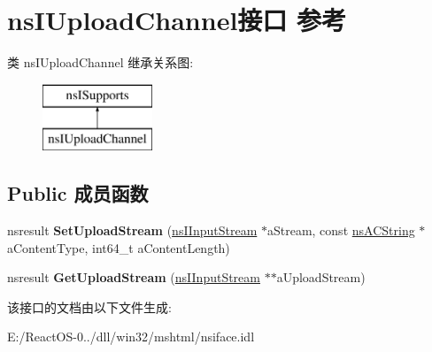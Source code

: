 \hypertarget{interfacens_i_upload_channel}{}\section{ns\+I\+Upload\+Channel接口 参考}
\label{interfacens_i_upload_channel}
类 ns\+I\+Upload\+Channel 继承关系图\+:\begin{figure}[H]
\begin{center}
\leavevmode
\includegraphics[height=2.000000cm]{interfacens_i_upload_channel}
\end{center}
\end{figure}
\subsection*{Public 成员函数}
\begin{DoxyCompactItemize}
\item 
\mbox{\label{interfacens_i_upload_channel_ab0c4fd2fafcd3bdb638252cf11cf1016}} 
nsresult {\bfseries Set\+Upload\+Stream} (\hyperlink{interfacens_i_input_stream}{ns\+I\+Input\+Stream} $\ast$a\+Stream, const \hyperlink{structns_c_string_container}{ns\+A\+C\+String} $\ast$a\+Content\+Type, int64\+\_\+t a\+Content\+Length)
\item 
\mbox{\label{interfacens_i_upload_channel_a3dc9cd19c2159530a815ce078e5df312}} 
nsresult {\bfseries Get\+Upload\+Stream} (\hyperlink{interfacens_i_input_stream}{ns\+I\+Input\+Stream} $\ast$$\ast$a\+Upload\+Stream)
\end{DoxyCompactItemize}


该接口的文档由以下文件生成\+:\begin{DoxyCompactItemize}
\item 
E\+:/\+React\+O\+S-\/0../dll/win32/mshtml/nsiface.\+idl\end{DoxyCompactItemize}
